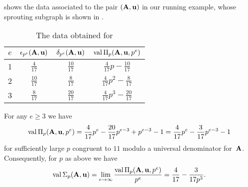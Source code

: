 \documentclass{article}
\begin{document}
\begin{example}
   \label{ex: ft.5}
    shows the data associated to the pair $(\mathbf{A},\mathbf{u})$ in our running example, whose sprouting subgraph is shown in .
   \begin{table}
      \begin{center}
         \begingroup
         \setlength{\tabcolsep}{8pt} %
         \renewcommand{\arraystretch}{1.4} %
         \begin{tabular}{cccc}
           \toprule
           $e$ & $\epsilon_{p^e}(\mathbf{A},\mathbf{u})$ & $\delta_{p^e}(\mathbf{A},\mathbf{u})$ & $\operatorname{val}\Pi_p(\mathbf{A},\mathbf{u},p^e)$ \\
           \midrule
           1 & $\frac{4}{17}$ & $\frac{10}{17}$ & $\frac{4}{17}p - \frac{10}{17}$\\
           2 & $\frac{10}{17}$ & $\frac{8}{17}$ & $\frac{4}{17}p^2 - \frac{8}{17}$ \\
           3 & $\frac{8}{17}$ & $\frac{20}{17}$ & $\frac{4}{17}p^3 - \frac{20}{17}$\\
           \bottomrule
         \end{tabular}
         \endgroup
      \end{center}
      \caption{The data obtained for }
      \label{table: running example data}
   \end{table}
   For any $e \ge 3$ we have
   \[
      \operatorname{val}\Pi_p(\mathbf{A},\mathbf{u},p^e) = \frac{4}{17}p^e - \frac{20}{17}p^{e-3} + p^{e-3} - 1
       = \frac{4}{17}p^e - \frac{3}{17}p^{e-3}  - 1
    \]
    for sufficiently large $p$ congruent to $11$ modulo a universal denominator for~$\mathbf{A}$.
    Consequently, for $p$ as above we have
    \[\operatorname{val} \Sigma_p(\mathbf{A},\mathbf{u}) = \lim_{e\to \infty}  \frac{\operatorname{val}\Pi_p(\mathbf{A},\mathbf{u},p^e)}{p^e} = \frac{4}{17} - \frac{3}{17p^3}.\]
\end{example}
\end{document}
